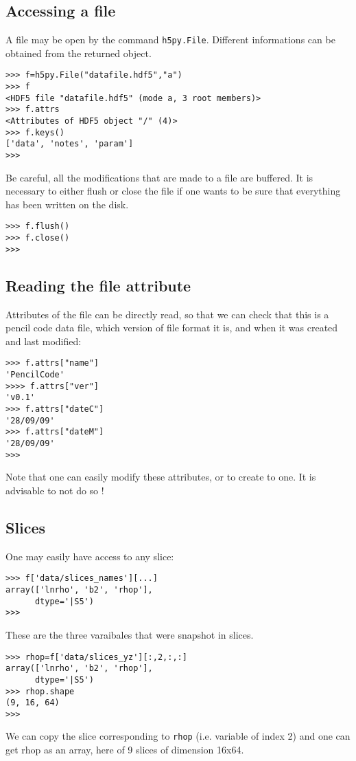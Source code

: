 \documentclass[a4paper,12pt]{article}
\begin{document}
\subsection{Accessing a file}
\label{sec:opening-file}

A file may be open by the command \texttt{h5py.File}. Different
informations can be obtained from the returned object.
\begin{verbatim}
>>> f=h5py.File("datafile.hdf5","a")
>>> f
<HDF5 file "datafile.hdf5" (mode a, 3 root members)>
>>> f.attrs
<Attributes of HDF5 object "/" (4)>
>>> f.keys()
['data', 'notes', 'param']
>>>
\end{verbatim}

Be careful, all the modifications that are made to a file are
buffered. It is necessary to either flush or close the file if one
wants to be sure that everything has been written on the disk.
\begin{verbatim}
>>> f.flush()
>>> f.close()
>>>
\end{verbatim}

\subsection{Reading the file attribute}
\label{sec:read-file-attr}

Attributes of the file can be directly read, so that we can check that
this is a pencil code data file, which version of file format it is,
and when it was created and last modified:
\begin{verbatim}
>>> f.attrs["name"]
'PencilCode'
>>>> f.attrs["ver"]
'v0.1'
>>> f.attrs["dateC"]
'28/09/09'
>>> f.attrs["dateM"]
'28/09/09'
>>>
\end{verbatim}
Note that one can easily modify these attributes, or to create to
one. It is advisable to not do so !

\subsection{Slices}
\label{sec:slices}

One may easily have access to any slice:
\begin{verbatim}
>>> f['data/slices_names'][...]
array(['lnrho', 'b2', 'rhop'], 
      dtype='|S5')
>>>
\end{verbatim}
These are the three varaibales that were snapshot in slices.
\begin{verbatim}
>>> rhop=f['data/slices_yz'][:,2,:,:]
array(['lnrho', 'b2', 'rhop'], 
      dtype='|S5')
>>> rhop.shape
(9, 16, 64)
>>>
\end{verbatim}
We can copy the slice corresponding to \texttt{rhop} (i.e. variable of
index 2) and one can get rhop as an array, here of 9 slices of
dimension 16x64.
\end{document}
